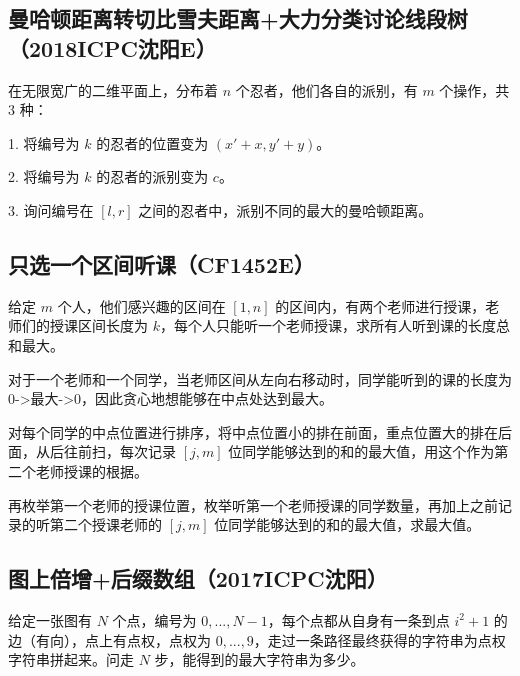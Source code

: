 \documentclass[landscape,twoside,a4paper]{article}
\begin{document}
\subsection{曼哈顿距离转切比雪夫距离+大力分类讨论线段树（2018ICPC沈阳E）}
在无限宽广的二维平面上，分布着 $n$ 个忍者，他们各自的派别，有 $m$ 个操作，共 $3$ 种：\par
1. 将编号为 $k$ 的忍者的位置变为 $(x'+x, y'+y)$。\par
2. 将编号为 $k$ 的忍者的派别变为 $c$。\par
3. 询问编号在 $[l,r]$ 之间的忍者中，派别不同的最大的曼哈顿距离。\par


\subsection{只选一个区间听课（CF1452E）}
给定 $m$ 个人，他们感兴趣的区间在 $[1,n]$ 的区间内，有两个老师进行授课，老师们的授课区间长度为 $k$，每个人只能听一个老师授课，求所有人听到课的长度总和最大。\par
对于一个老师和一个同学，当老师区间从左向右移动时，同学能听到的课的长度为0->最大->0，因此贪心地想能够在中点处达到最大。\par
对每个同学的中点位置进行排序，将中点位置小的排在前面，重点位置大的排在后面，从后往前扫，每次记录 $[j,m]$ 位同学能够达到的和的最大值，用这个作为第二个老师授课的根据。\par
再枚举第一个老师的授课位置，枚举听第一个老师授课的同学数量，再加上之前记录的听第二个授课老师的 $[j,m]$ 位同学能够达到的和的最大值，求最大值。\par


\subsection{图上倍增+后缀数组（2017ICPC沈阳）}
给定一张图有 $N$ 个点，编号为 $0,...,N-1$，每个点都从自身有一条到点 $i^{2}+1$ 的边（有向），点上有点权，点权为 $0,...,9$，走过一条路径最终获得的字符串为点权字符串拼起来。问走 $N$ 步，能得到的最大字符串为多少。

\end{document}
